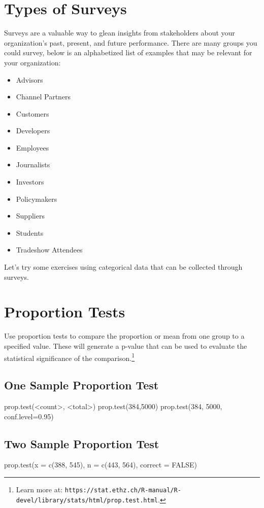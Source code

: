 %
%
%
%
%

\section{Types of Surveys}
Surveys are a valuable way to glean insights from stakeholders about your organization's past, present, and future performance. There are many groups you could survey, below is an alphabetized list of examples that may be relevant for your organization:

\begin{itemize}
 \item Advisors
 \item Channel Partners
 \item Customers
 \item Developers
 \item Employees
 \item Journalists
 \item Investors
 \item Policymakers
 \item Suppliers
 \item Students
 \item Tradeshow Attendees
\end{itemize}

Let's try some exercises using categorical data that can be collected through surveys. 

\section{Proportion Tests}
Use proportion tests to compare the proportion or mean from one group to a specified value. These will generate a p-value that can be used to evaluate the statistical significance of the comparison.\footnote{Learn more at: \texttt{https://stat.ethz.ch/R-manual/R-devel/library/stats/html/prop.test.html}.}

\subsection{One Sample Proportion Test}
prop.test(<count>, <total>)
prop.test(384,5000)
prop.test(384, 5000, conf.level=0.95)

\subsection{Two Sample Proportion Test}
prop.test(x = c(388, 545), n = c(443, 564), correct = FALSE)

